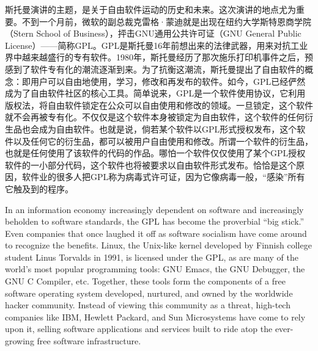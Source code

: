\ifdefined\chs
斯托曼演讲的主题，是关于自由软件运动的历史和未来。这次演讲的地点尤为重要。不到一个月前，微软的副总裁克雷格·蒙迪就是出现在纽约大学斯特恩商学院（Stern School of Business），抨击GNU通用公共许可证（GNU General Public License）——简称GPL。GPL是斯托曼16年前想出来的法律武器，用来对抗工业界中越来越盛行的专有软件。1980年，斯托曼经历了那次施乐打印机事件之后，预感到了软件专有化的潮流逐渐到来。为了抗衡这潮流，斯托曼提出了自由软件的概念：即用户可以自由地使用，学习，修改和再发布的软件。如今，GPL已经俨然成为了自由软件社区的核心工具。简单说来，GPL是一个软件使用协议，它利用版权法，将自由软件锁定在公众可以自由使用和修改的领域。一旦锁定，这个软件就不会再被专有化。不仅仅是这个软件本身被锁定为自由软件，这个软件的任何衍生品也会成为自由软件。也就是说，倘若某个软件以GPL形式授权发布，这个软件以及任何它的衍生品，都可以被用户自由使用和修改。所谓一个软件的衍生品，也就是任何使用了该软件的代码的作品。哪怕一个软件仅仅使用了某个GPL授权软件的一小部分代码，这个软件也将被要求以自由软件形式发布。恰恰是这个原因，软件业的很多人把GPL称为病毒式许可证，因为它像病毒一般，``感染''所有它触及到的程序。


\fi

\ifdefined\eng
In an information economy increasingly dependent on software and increasingly beholden to software standards, the GPL has become the proverbial ``big stick.'' Even companies that once laughed it off as software socialism have come around to recognize the benefits. Linux, the Unix-like kernel developed by Finnish college student Linus Torvalds in 1991, is licensed under the GPL, as are many of the world's most popular programming tools: GNU Emacs, the GNU Debugger, the GNU C Compiler, etc. Together, these tools form the components of a free software operating system developed, nurtured, and owned by the worldwide hacker community. Instead of viewing this community as a threat, high-tech companies like IBM, Hewlett Packard, and Sun Microsystems have come to rely upon it, selling software applications and services built to ride atop the ever-growing free software infrastructure.
\fi

